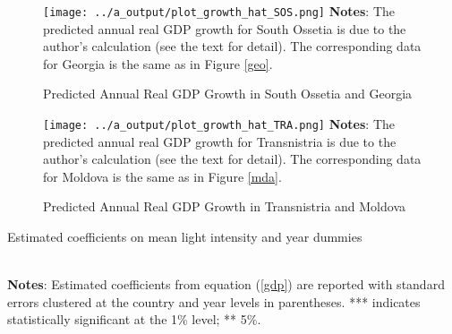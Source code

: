 \documentclass[12pt,a4paper]{article}%
\begin{document}
\begin{figure}[ptb]
\caption{Predicted Annual Real GDP Growth in South Ossetia and Georgia}
\texttt{[image: ../a\_output/plot\_growth\_hat\_SOS.png]}
\label{sos}%
{\scriptsize \textbf{Notes}: 
	The predicted annual real GDP growth for South Ossetia is due to the author's calculation (see the text for detail).
	The corresponding data for Georgia is the same as in Figure \ref{geo}.
}
\end{figure}

\begin{figure}[ptb]
\caption{Predicted Annual Real GDP Growth in Transnistria and Moldova}
\texttt{[image: ../a\_output/plot\_growth\_hat\_TRA.png]}
\label{tra}%
{\scriptsize \textbf{Notes}: 
	The predicted annual real GDP growth for Transnistria is due to the author's calculation (see the text for detail).
	The corresponding data for Moldova is the same as in Figure \ref{mda}.
}
\end{figure}

\begin{table}[ptb]
\caption{Estimated coefficients on mean light intensity and year dummies}%
\label{estimates}%
\\
{\scriptsize \textbf{Notes}: 
	Estimated coefficients from equation (\ref{gdp}) are reported with standard errors clustered at the country and year levels in parentheses. *** indicates statistically significant at the 1\% level; ** 5\%.
}
\end{table}
\end{document}
